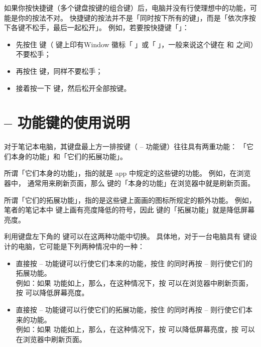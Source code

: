 如果你按快捷键（多个键盘按键的组合键）后，电脑并没有行使理想中的功能，可能是你的按法不对。
快捷键的按法并不是「同时按下所有的键」，而是「依次序按下各键不松手，最后一起松开」。
例如，若要按快捷键「」：

\begin{itemize}
  \item 先按住  键（ 键上印有Window 徽标「」或「」，一般来说这个键在  和  之间）不要松手；
  \item 再按住  键，同样不要松手；
  \item 接着按一下  键，然后松开全部按键。
\end{itemize}

\section{ --  功能键的使用说明}

对于笔记本电脑，其键盘最上方一排按键（ --  功能键）往往具有两重功能：
「它们本身的功能」和「它们的拓展功能」。

所谓「它们本身的功能」，指的就是 app 中规定的这些键的功能。
例如，在浏览器中， 通常用来刷新页面，那么  键的「本身的功能」在浏览器中就是刷新页面。

所谓「它们的拓展功能」，指的是这些键上面画的图标所规定的额外功能。
例如，笔者的笔记本中  键上画有亮度降低的符号，因此  键的「拓展功能」就是降低屏幕亮度。

利用键盘左下角的  键可以在这两种功能中切换。
具体地，对于一台电脑具有  键设计的电脑，它可能是下列两种情况中的一种：

\begin{itemize}
  \item 直接按  --  功能键可以行使它们本来的功能，按住  的同时再按  --  则行使它们的拓展功能。\\
    例如：如果  功能如上，那么，在这种情况下，按  可以在浏览器中刷新页面，按  可以降低屏幕亮度。
  \item 直接按  --  功能键可以行使它们的拓展功能，按住  的同时再按  --  则行使它们本来的功能。\\
    例如：如果  功能如上，那么，在这种情况下，按  可以降低屏幕亮度，按  可以在浏览器中刷新页面。
\end{itemize}

